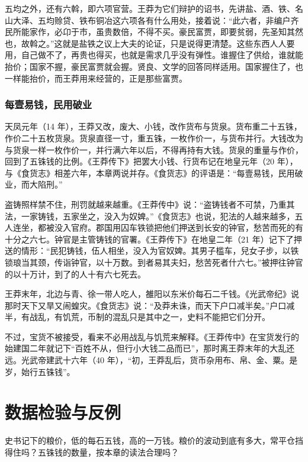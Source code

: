 五均之外，还有六斡，即六项官营。王莽为它们辩护的诏书，先讲盐、酒、铁、名山大泽、五均赊贷、铁布铜冶这六项各有什么用处，接着说：“此六者，非编户齐民所能家作，必卬于市，虽贵数倍，不得不买。豪民富贾，即要贫弱，先圣知其然也，故斡之。”\cite{hanshu}这就是盐铁之议上大夫的论证，只是说得更清楚。这些东西人人要用，自己做不了，再贵也得买，也就是需求几乎没有弹性。谁握住了供给，谁就能抬价；国家不握，豪民富贾就会握。贤良、文学的回答同样适用。国家握住了，也一样能抬价，而王莽用来经营的，正是那些富贾。

\subsubsection{每壹易钱，民用破业}
天凤元年（14 年），王莽又改，废大、小钱，改作货布与货泉。货布重二十五铢，作价二十五枚货泉。货泉直径一寸，重五铢，一枚作价一，与货布并行。大钱改为与货泉一样一枚作价一，并行满六年以后，不得再持有大钱\cite{hanshu}。货泉的重量与作价，回到了五铢钱的比例。《王莽传下》把罢大小钱、行货布记在地皇元年（20 年）\cite{hanshu}，与《食货志》相差六年，本章两说并存。《食货志》的评语是：“每壹易钱，民用破业，而大陷刑。”\cite{hanshu}

盗铸照样禁不住，刑罚就越来越重。《王莽传中》说：“盗铸钱者不可禁，乃重其法，一家铸钱，五家坐之，没入为奴婢。”\cite{hanshu}《食货志》也说，犯法的人越来越多，五人连坐，都被没入官府。郡国用囚车铁锁把他们押送到长安的钟官，愁苦而死的有十分之六七\cite{hanshu}。钟官是主管铸钱的官署。《王莽传下》在地皇二年（21 年）记下了押送的情形：“民犯铸钱，伍人相坐，没入为官奴婢。其男子槛车，兒女子步，以铁锁琅当其颈，传诣钟官，以十万数。到者易其夫妇，愁苦死者什六七。”\cite{hanshu}被押往钟官的以十万计，到了的人十有六七死去。

王莽末年，北边与青、徐一带人吃人，雒阳以东米价每石二千钱\cite{hanshu}。《光武帝纪》说那时天下又旱又闹蝗灾\cite{houhanshu}。《食货志》说：“及莽未诛，而天下户口减半矣。”\cite{hanshu}户口减半，有战乱，有饥荒，币制的混乱只是其中之一，史料不能把它们分开。

不过，宝货不被接受，看来不必用战乱与饥荒来解释。《王莽传中》在宝货发行的始建国二年就记下“百姓不从，但行小大钱二品而已”\cite{hanshu}，那时离王莽末年的大乱还远。光武帝建武十六年（40 年），“初，王莽乱后，货币杂用布、帛、金、粟。是岁，始行五铢钱”\cite{houhanshu}。

\section{数据检验与反例}\label{sec:qinhan-test}

史书记下的粮价，低的每石五钱，高的一万钱。粮价的波动到底有多大，常平仓挡得住吗？五铢钱的数量，按本章的读法合理吗？

